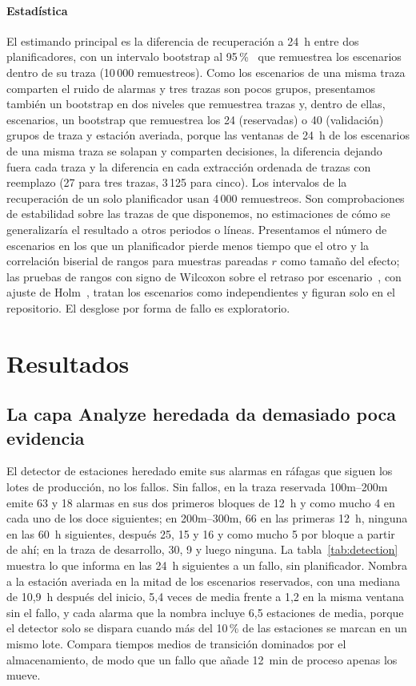 \documentclass[preprint,11pt]{elsarticle}
\begin{document}
\paragraph{Estadística}
El estimando principal es la diferencia de recuperación a 24~h entre dos planificadores, con un intervalo bootstrap al 95\,\%~\cite{efron1993bootstrap} que remuestrea los escenarios dentro de su traza (10\,000 remuestreos). Como los escenarios de una misma traza comparten el ruido de alarmas y tres trazas son pocos grupos, presentamos también un bootstrap en dos niveles que remuestrea trazas y, dentro de ellas, escenarios, un bootstrap que remuestrea los 24 (reservadas) o 40 (validación) grupos de traza y estación averiada, porque las ventanas de 24~h de los escenarios de una misma traza se solapan y comparten decisiones, la diferencia dejando fuera cada traza y la diferencia en cada extracción ordenada de trazas con reemplazo (27 para tres trazas, 3\,125 para cinco). Los intervalos de la recuperación de un solo planificador usan 4\,000 remuestreos. Son comprobaciones de estabilidad sobre las trazas de que disponemos, no estimaciones de cómo se generalizaría el resultado a otros periodos o líneas. Presentamos el número de escenarios en los que un planificador pierde menos tiempo que el otro y la correlación biserial de rangos para muestras pareadas $r$ como tamaño del efecto; las pruebas de rangos con signo de Wilcoxon sobre el retraso por escenario~\cite{wilcoxon1945}, con ajuste de Holm~\cite{holm1979}, tratan los escenarios como independientes y figuran solo en el repositorio. El desglose por forma de fallo es exploratorio.

\section{Resultados}
\label{sec:results}

\subsection{La capa Analyze heredada da demasiado poca evidencia}
\label{sec:legacy}
El detector de estaciones heredado emite sus alarmas en ráfagas que siguen los lotes de producción, no los fallos. Sin fallos, en la traza reservada 100m--200m emite 63 y 18 alarmas en sus dos primeros bloques de 12~h y como mucho 4 en cada uno de los doce siguientes; en 200m--300m, 66 en las primeras 12~h, ninguna en las 60~h siguientes, después 25, 15 y 16 y como mucho 5 por bloque a partir de ahí; en la traza de desarrollo, 30, 9 y luego ninguna. La tabla~\ref{tab:detection} muestra lo que informa en las 24~h siguientes a un fallo, sin planificador. Nombra a la estación averiada en la mitad de los escenarios reservados, con una mediana de 10{,}9~h después del inicio, 5{,}4 veces de media frente a 1{,}2 en la misma ventana sin el fallo, y cada alarma que la nombra incluye 6{,}5 estaciones de media, porque el detector solo se dispara cuando más del 10\,\% de las estaciones se marcan en un mismo lote. Compara tiempos medios de transición dominados por el almacenamiento, de modo que un fallo que añade 12~min de proceso apenas los mueve.
\end{document}
